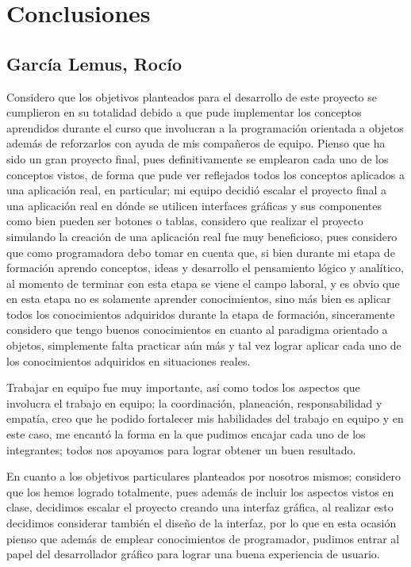 \section*{Conclusiones}

\subsection*{García Lemus, Rocío}
Considero que los objetivos planteados para el desarrollo de este proyecto se cumplieron 
en su totalidad debido a que pude implementar los conceptos aprendidos durante el curso que 
involucran a la programación orientada a objetos además de reforzarlos con ayuda de mis 
compañeros de equipo. Pienso que ha sido un gran proyecto final, pues definitivamente 
se emplearon cada uno de los conceptos vistos, de forma que pude ver reflejados
todos los conceptos aplicados a una aplicación real, en particular; mi equipo decidió escalar el 
proyecto final a una aplicación real en dónde se utilicen interfaces gráficas y sus componentes 
como bien pueden ser botones o tablas, considero que realizar el proyecto simulando la creación 
de una aplicación real fue muy beneficioso, pues considero que como programadora debo tomar en 
cuenta que, si bien durante mi etapa de formación aprendo conceptos, ideas y desarrollo el 
pensamiento lógico y analítico, al momento de terminar con esta etapa se viene el campo laboral, 
y es obvio que en esta etapa no es solamente aprender conocimientos, sino más bien es aplicar 
todos los conocimientos adquiridos durante la etapa de formación, sinceramente considero que 
tengo buenos conocimientos en cuanto al paradigma orientado a objetos, simplemente falta 
practicar aún más y tal vez lograr aplicar cada uno de los conocimientos adquiridos en 
situaciones reales. 

Trabajar en equipo fue muy importante, así como todos los aspectos que involucra el trabajo 
en equipo; la coordinación, planeación, responsabilidad y empatía, creo que he podido fortalecer 
mis habilidades del trabajo en equipo y en este caso, me encantó la forma en la que pudimos 
encajar cada uno de los integrantes; todos nos apoyamos para lograr obtener un buen resultado. 

En cuanto a los objetivos particulares planteados por nosotros mismos; considero que los hemos 
logrado totalmente, pues además de incluir los aspectos vistos en clase, decidimos escalar el 
proyecto creando una interfaz gráfica, al realizar esto decidimos considerar también el diseño de la 
interfaz, por lo que en esta ocasión pienso que además de emplear conocimientos de 
programador, pudimos entrar al papel del desarrollador gráfico para lograr una buena 
experiencia de usuario. 


